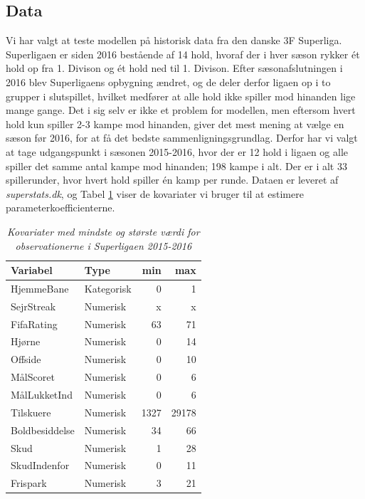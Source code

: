 \documentclass[11pt,a4paper]{article}
\begin{document}
\subsection{Data}
Vi har valgt at teste modellen på historisk data fra den danske 3F Superliga. Superligaen er siden 2016 bestående af 14 hold, hvoraf der i hver sæson rykker ét hold op fra 1. Divison og ét hold ned til 1. Divison. Efter sæsonafslutningen i 2016 blev Superligaens opbygning ændret, og de deler derfor ligaen op i to grupper i slutspillet, hvilket medfører at alle hold ikke spiller mod hinanden lige mange gange. Det i sig selv er ikke et problem for modellen, men eftersom hvert hold kun spiller 2-3 kampe mod hinanden, giver det mest mening at vælge en sæson før 2016, for at få det bedste sammenligningsgrundlag. Derfor har vi valgt at tage udgangspunkt i sæsonen 2015-2016, hvor der er 12 hold i ligaen og alle spiller det samme antal kampe mod hinanden; 198 kampe i alt. Der er i alt 33 spillerunder, hvor hvert hold spiller én kamp per runde. Dataen er leveret af \textit{superstats.dk}, og Tabel \ref{tab:Kovariater} viser de kovariater vi bruger til at estimere parameterkoefficienterne.
\begin{table}[ht]
\centering
\begin{adjustbox}{max width=\textwidth}
\begin{tabular}{|l|lrr|}
  \hline
Variabel & Type & min & max \\ 
  \hline
HjemmeBane & Kategorisk & 0 & 1\\
SejrStreak & Numerisk & x & x\\
FifaRating & Numerisk & 63 & 71\\
Hjørne & Numerisk & 0 & 14\\
Offside & Numerisk & 0 & 10\\
MålScoret & Numerisk & 0 & 6\\
MålLukketInd & Numerisk & 0 & 6\\
Tilskuere & Numerisk & 1327 & 29178\\
Boldbesiddelse & Numerisk & 34 & 66\\
Skud & Numerisk & 1 & 28\\
SkudIndenfor & Numerisk & 0 & 11\\
Frispark & Numerisk & 3 & 21 \\
   \hline
\end{tabular}
\end{adjustbox}
\caption{\label{tab:Kovariater}\textit{Kovariater med mindste og største værdi for observationerne i Superligaen 2015-2016}}
\end{table}
\end{document}
